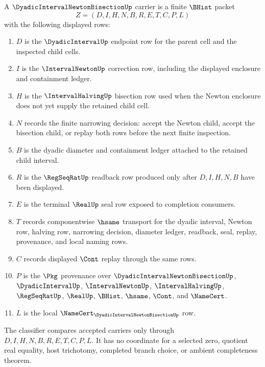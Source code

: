\begin{definition}
\label{def:dyadic-interval-newton-bisection-carrier}
A $\DyadicIntervalNewtonBisectionUp$ carrier is a finite $\BHist$ packet
$$
Z=(D,I,H,N,B,R,E,T,C,P,L)
$$
with the following displayed rows:
\begin{enumerate}
\item $D$ is the $\DyadicIntervalUp$ endpoint row for the parent cell and the inspected child cells.
\item $I$ is the $\IntervalNewtonUp$ correction row, including the displayed enclosure and containment ledger.
\item $H$ is the $\IntervalHalvingUp$ bisection row used when the Newton enclosure does not yet supply the retained child cell.
\item $N$ records the finite narrowing decision: accept the Newton child, accept the bisection child, or replay both rows before the next finite inspection.
\item $B$ is the dyadic diameter and containment ledger attached to the retained child interval.
\item $R$ is the $\RegSeqRatUp$ readback row produced only after $D,I,H,N,B$ have been displayed.
\item $E$ is the terminal $\RealUp$ seal row exposed to completion consumers.
\item $T$ records componentwise $\hsame$ transport for the dyadic interval, Newton row, halving row, narrowing decision, diameter ledger, readback, seal, replay, provenance, and local naming rows.
\item $C$ records displayed $\Cont$ replay through the same rows.
\item $P$ is the $\Pkg$ provenance over $\DyadicIntervalNewtonBisectionUp$, $\DyadicIntervalUp$, $\IntervalNewtonUp$, $\IntervalHalvingUp$, $\RegSeqRatUp$, $\RealUp$, $\BHist$, $\hsame$, $\Cont$, and $\NameCert$.
\item $L$ is the local $\NameCert_{\DyadicIntervalNewtonBisectionUp}$ row.
\end{enumerate}
The classifier compares accepted carriers only through $D,I,H,N,B,R,E,T,C,P,L$. It has no coordinate for a selected zero, quotient real equality, host trichotomy, completed branch choice, or ambient completeness theorem.
\end{definition}

